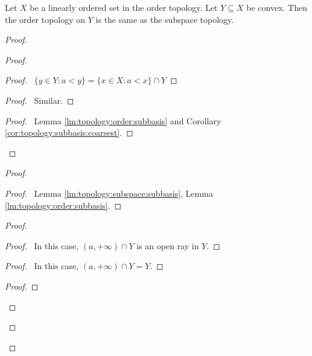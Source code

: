 \begin{thm}
  Let $X$ be a linearly ordered set in the order topology. Let $Y \subseteq
  X$
  be convex. Then the order topology on $Y$ is the same as the subspace
  topology.
\end{thm}

\begin{proof}
  \pf
  \begin{proof}
    \begin{proof}
      \pf\ $\{ y \in Y : a < y \} = \{ x \in X : a < x \} \cap Y$
    \end{proof}
    \begin{proof}
      \pf\ Similar.
    \end{proof}
    \qedstep
    \begin{proof}
      \pf\ Lemma \ref{lm:topology:order:subbasis} and Corollary
      \ref{cor:topology:subbasis:coarsest}.
    \end{proof}
  \end{proof}
  \begin{proof}
    \begin{proof}
      \pf\ Lemma \ref{lm:topology:subspace:subbasis}, Lemma
      \ref{lm:topology:order:subbasis}.
    \end{proof}
    \begin{proof}
      \begin{proof}
        \pf\ In this case, $(a, +\infty) \cap Y$ is an open ray in $Y$.
      \end{proof}
      \begin{proof}
        \pf\ In this case, $(a, +\infty) \cap Y = Y$.
      \end{proof}
      \begin{proof}

\end{proof}
\end{proof}
\end{proof}
\end{proof}
